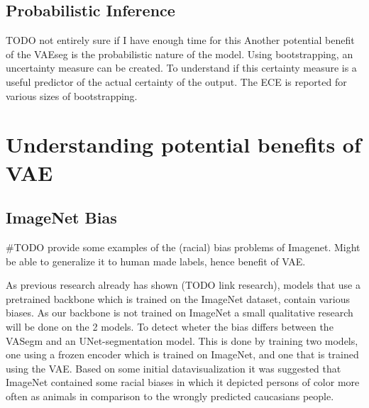 \subsection{Probabilistic Inference}
TODO not entirely sure if I have enough time for this
Another potential benefit of the VAEseg is the probabilistic nature of the model. Using bootstrapping, an uncertainty measure can be created. To understand if this certainty measure is a useful predictor of the actual certainty of the output. The ECE is reported for various sizes of bootstrapping.

\section{Understanding potential benefits of VAE}
\subsection*{ImageNet Bias}
\#TODO provide some examples of the (racial) bias problems of Imagenet. Might be able to generalize it to human made labels, hence benefit of VAE.

As previous research already has shown (TODO link research), models that use a pretrained backbone which is trained on the ImageNet dataset, contain various biases. As our backbone is not trained on ImageNet a small qualitative research will be done on the 2 models. To detect wheter the bias differs between the VASegm and an UNet-segmentation model. This is done by training two models, one using a frozen encoder which is trained on ImageNet, and one that is trained using the VAE. Based on some initial datavisualization it was suggested that ImageNet contained some racial biases in which it depicted persons of color more often as animals in comparison to the wrongly predicted caucasians people.




